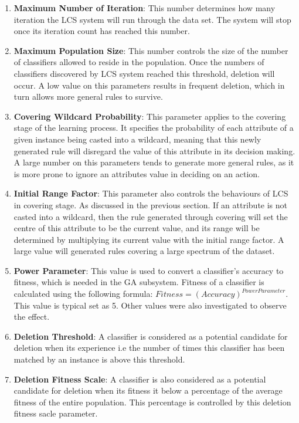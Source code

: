 \documentclass[11pt]{article}
\begin{document}
\begin{enumerate}
	\itemsep0em
	\item \textbf{Maximum Number of Iteration}: This number determines how many iteration the LCS system will run through the data set. The system will stop once its iteration count has reached this number.
	\item \textbf{Maximum Population Size}: This number controls the size of the number of classifiers allowed to reside in the    population. Once the numbers of classifiers discovered by LCS system reached this threshold, deletion will occur. A low value on this parameters results in frequent deletion, which in turn allows more general rules to survive.
	\item \textbf{Covering Wildcard Probability}: This parameter applies to the covering stage of the learning process. It specifies the probability of each attribute of a given instance being casted into a wildcard, meaning that this newly generated rule will disregard the value of this attribute in its decision making. A large number on this parameters tends to generate more general rules, as it is more prone to ignore an attributes value in deciding on an action. 
	\item \textbf{Initial Range Factor}: This parameter also controls the behaviours of LCS in covering stage. As discussed in the previous section. If an attribute is not casted into a wildcard, then the rule generated through covering will set the centre of this attribute to be the current value, and its range will be determined by multiplying its current value with the initial range factor. A large value will generated rules covering a large spectrum of the dataset.  
	\item \textbf{Power Parameter}:	This value is used to convert a classifier's accuracy to fitness, which is needed in the GA subsystem. Fitness of a classifier is calculated using the following formula:	$Fitness = (Accuracy)^{Power Parameter}$. This value is typical set as 5. Other values were also investigated to observe the effect.
	\item \textbf{Deletion Threshold}: A classifier is considered as a potential candidate for deletion when its experience i.e the number of times this classifier has been matched by an instance is above this threshold. 
	\item \textbf{Deletion Fitness Scale}: A classifier is also considered as a potential candidate for deletion when its fitness it below a percentage of the average fitness of the entire population. This percentage is controlled by this deletion fitness sacle parameter. 

\end{enumerate}
\end{document}
